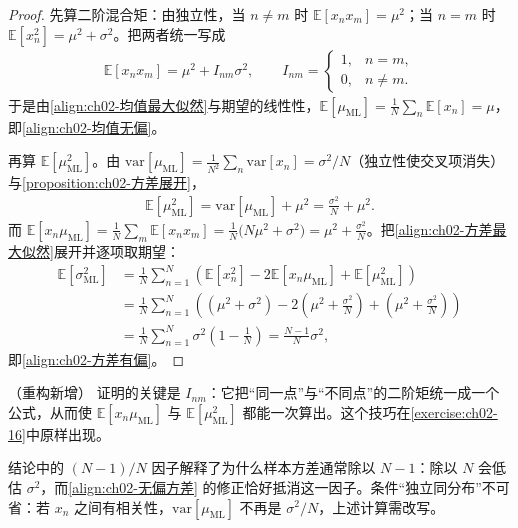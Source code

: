 \documentclass[../../main.tex]{subfiles}
\begin{document}
\begin{proof}
先算二阶混合矩：由独立性，当 $n\neq m$ 时 $\mathbb{E}[x_nx_m]=\mu^{2}$；当 $n=m$ 时 $\mathbb{E}[x_n^{2}]=\mu^{2}+\sigma^{2}$。把两者统一写成
\begin{align*}
  \mathbb{E}[x_nx_m] = \mu^{2} + I_{nm}\sigma^{2},\qquad
  I_{nm} = \begin{cases}1, & n=m,\\ 0, & n\neq m.\end{cases}
\end{align*}
于是由\eqref{align:ch02-均值最大似然}与期望的线性性，$\mathbb{E}[\mu_{\mathrm{ML}}]=\frac{1}{N}\sum_n\mathbb{E}[x_n]=\mu$，即\eqref{align:ch02-均值无偏}。

再算 $\mathbb{E}[\mu_{\mathrm{ML}}^{2}]$。由 $\mathrm{var}[\mu_{\mathrm{ML}}]=\frac{1}{N^{2}}\sum_{n}\mathrm{var}[x_n]=\sigma^{2}/N$（独立性使交叉项消失）与\cref{proposition:ch02-方差展开}，
\begin{align*}
  \mathbb{E}\left[\mu_{\mathrm{ML}}^{2}\right] = \mathrm{var}\left[\mu_{\mathrm{ML}}\right] + \mu^{2} = \frac{\sigma^{2}}{N} + \mu^{2} .
\end{align*}
而 $\mathbb{E}[x_n\mu_{\mathrm{ML}}]=\frac{1}{N}\sum_m\mathbb{E}[x_nx_m]=\frac{1}{N}\big(N\mu^{2}+\sigma^{2}\big)=\mu^{2}+\frac{\sigma^{2}}{N}$。把\eqref{align:ch02-方差最大似然}展开并逐项取期望：
\begin{align*}
  \mathbb{E}\left[\sigma_{\mathrm{ML}}^{2}\right]
  &= \frac{1}{N}\sum_{n=1}^{N}\left(\mathbb{E}[x_n^{2}] - 2\mathbb{E}[x_n\mu_{\mathrm{ML}}] + \mathbb{E}[\mu_{\mathrm{ML}}^{2}]\right) \\
  &= \frac{1}{N}\sum_{n=1}^{N}\left((\mu^{2}+\sigma^{2}) - 2\left(\mu^{2}+\frac{\sigma^{2}}{N}\right) + \left(\mu^{2}+\frac{\sigma^{2}}{N}\right)\right) \\
  &= \frac{1}{N}\sum_{n=1}^{N}\sigma^{2}\left(1-\frac{1}{N}\right) = \frac{N-1}{N}\sigma^{2} ,
\end{align*}
即\eqref{align:ch02-方差有偏}。
\end{proof}

\begin{remark}（重构新增）
证明的关键是 $I_{nm}$：它把“同一点”与“不同点”的二阶矩统一成一个公式，从而使 $\mathbb{E}[x_n\mu_{\mathrm{ML}}]$ 与 $\mathbb{E}[\mu_{\mathrm{ML}}^{2}]$ 都能一次算出。这个技巧在\cref{exercise:ch02-16}中原样出现。

结论中的 $(N-1)/N$ 因子解释了为什么样本方差通常除以 $N-1$：除以 $N$ 会低估 $\sigma^{2}$，而\eqref{align:ch02-无偏方差} 的修正恰好抵消这一因子。条件“独立同分布”不可省：若 $x_n$ 之间有相关性，$\mathrm{var}[\mu_{\mathrm{ML}}]$ 不再是 $\sigma^{2}/N$，上述计算需改写。
\end{remark}
\end{document}
